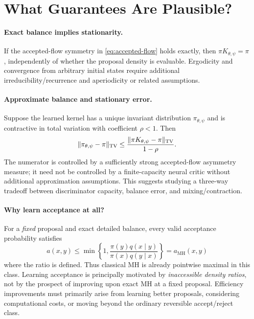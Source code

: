 \documentclass[11pt]{article}
\begin{document}
\section{What Guarantees Are Plausible?}
\paragraph{Exact balance implies stationarity.}
If the accepted-flow symmetry in \eqref{eq:accepted-flow} holds exactly, then $\pi K_{\theta,\psi}=\pi$, independently of whether the proposal density is evaluable. Ergodicity and convergence from arbitrary initial states require additional irreducibility/recurrence and aperiodicity or related assumptions.

\paragraph{Approximate balance and stationary error.}
Suppose the learned kernel has a unique invariant distribution $\pi_{\theta,\psi}$ and is contractive in total variation with coefficient $\rho<1$. Then
\begin{equation}
\|\pi_{\theta,\psi}-\pi\|_{\mathop{\mathrm{TV}}}
\le\frac{\|\pi K_{\theta,\psi}-\pi\|_{\mathop{\mathrm{TV}}}}{1-\rho}.
\label{eq:stability}
\end{equation}
The numerator is controlled by a sufficiently strong accepted-flow asymmetry measure; it need not be controlled by a finite-capacity neural critic without additional approximation assumptions. This suggests studying a three-way tradeoff between discriminator capacity, balance error, and mixing/contraction.

\paragraph{Why learn acceptance at all?}
For a \emph{fixed} proposal and exact detailed balance, every valid acceptance probability satisfies
\begin{equation}
a(x,y)\le\min\left\{1,\frac{\pi(y)q(x\mid y)}{\pi(x)q(y\mid x)}\right\}=a_{\mathrm{MH}}(x,y)
\end{equation}
where the ratio is defined. Thus classical MH is already pointwise maximal in this class. Learning acceptance is principally motivated by \emph{inaccessible density ratios}, not by the prospect of improving upon exact MH at a fixed proposal. Efficiency improvements must primarily arise from learning better proposals, considering computational costs, or moving beyond the ordinary reversible accept/reject class.
\end{document}
